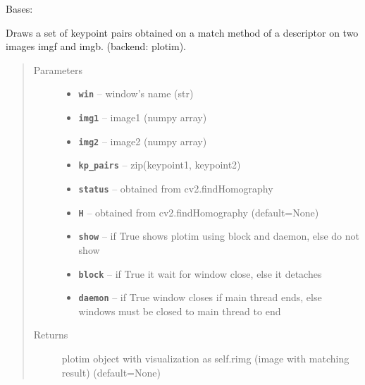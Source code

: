 \documentclass[letterpaper,10pt,english]{sphinxmanual}
\begin{document}

\begin{fulllineitems}
\label{RRtoolbox.lib:RRtoolbox.lib.plotter.matchExplorer}
Bases: {\hyperref[RRtoolbox.lib:RRtoolbox.lib.plotter.plotim]{\emph{}}}

Draws a set of keypoint pairs obtained on a match method of a descriptor
on two images imgf and imgb. (backend: plotim).
\begin{quote}\begin{description}
\item[{Parameters}] \leavevmode\begin{itemize}
\item {} 
\textbf{\texttt{win}} -- window's name (str)

\item {} 
\textbf{\texttt{img1}} -- image1 (numpy array)

\item {} 
\textbf{\texttt{img2}} -- image2 (numpy array)

\item {} 
\textbf{\texttt{kp\_pairs}} -- zip(keypoint1, keypoint2)

\item {} 
\textbf{\texttt{status}} -- obtained from cv2.findHomography

\item {} 
\textbf{\texttt{H}} -- obtained from cv2.findHomography (default=None)

\item {} 
\textbf{\texttt{show}} -- if True shows plotim using block and daemon, else do not show

\item {} 
\textbf{\texttt{block}} -- if True it wait for window close, else it detaches

\item {} 
\textbf{\texttt{daemon}} -- if True window closes if main thread ends, else windows must be closed to main thread to end

\end{itemize}

\item[{Returns}] \leavevmode
plotim object with visualization as self.rimg (image with matching result) (default=None)


\end{description}
\end{quote}
\end{fulllineitems}
\end{document}
